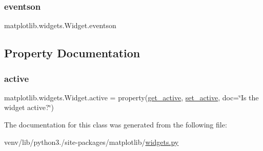 \mbox{\label{classmatplotlib_1_1widgets_1_1Widget_a86482bd0cd2f83ad1bf4337d837a7057}} 
\subsubsection{\texorpdfstring{eventson}{eventson}}
{\footnotesize\ttfamily matplotlib.\+widgets.\+Widget.\+eventson\hspace{0.3cm}{\ttfamily [static]}}



\subsection{Property Documentation}
\mbox{\label{classmatplotlib_1_1widgets_1_1Widget_a6fc79b9a86770ee3a3b46ea419b7ad74}} 
\subsubsection{\texorpdfstring{active}{active}}
{\footnotesize\ttfamily matplotlib.\+widgets.\+Widget.\+active = property(\hyperlink{classmatplotlib_1_1widgets_1_1Widget_a60f17f8bf5a5a5456e8956ff45d41051}{get\+\_\+active}, \hyperlink{classmatplotlib_1_1widgets_1_1Widget_a77e00e53e44f4b872499004051120f71}{set\+\_\+active}, doc=\char`\"{}Is the widget active?\char`\"{})\hspace{0.3cm}{\ttfamily [static]}}



The documentation for this class was generated from the following file\+:\begin{DoxyCompactItemize}
\item 
venv/lib/python3./site-\/packages/matplotlib/\hyperlink{widgets_8py}{widgets.\+py}\end{DoxyCompactItemize}
